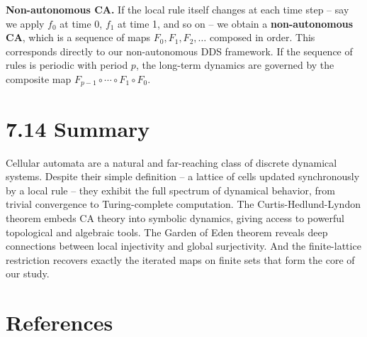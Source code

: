 \textbf{Non-autonomous CA.} If the local rule itself changes at each time step -- say we apply $f_0$ at time 0, $f_1$ at time 1, and so on -- we obtain a \textbf{non-autonomous CA}, which is a sequence of maps $F_0, F_1, F_2, \ldots$ composed in order. This corresponds directly to our non-autonomous DDS framework. If the sequence of rules is periodic with period $p$, the long-term dynamics are governed by the composite map $F_{p-1} \circ \cdots \circ F_1 \circ F_0$.


\section{7.14 Summary}

Cellular automata are a natural and far-reaching class of discrete dynamical systems. Despite their simple definition -- a lattice of cells updated synchronously by a local rule -- they exhibit the full spectrum of dynamical behavior, from trivial convergence to Turing-complete computation. The Curtis-Hedlund-Lyndon theorem embeds CA theory into symbolic dynamics, giving access to powerful topological and algebraic tools. The Garden of Eden theorem reveals deep connections between local injectivity and global surjectivity. And the finite-lattice restriction recovers exactly the iterated maps on finite sets that form the core of our study.


\section{References}

